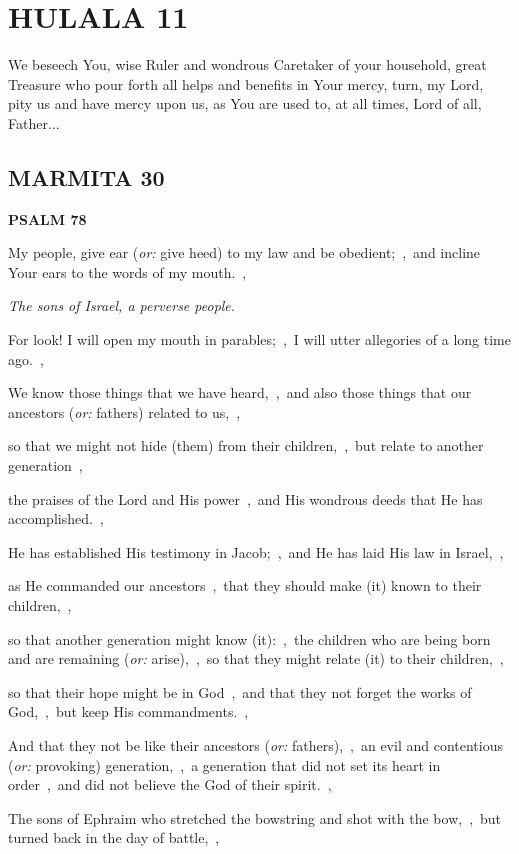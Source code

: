 \documentclass[12pt,twoside,a5paper]{article}
\newcommand{\hulala}[1]{\section*{HULALA {#1}}}
\newcommand{\marmita}[1]{\subsection*{MARMITA {#1}}}
\newcommand{\psalm}[1]{\textbf{PSALM {#1}}\nopagebreak}
\newcommand{\qanona}[1]{{\liturgicalhint{Qanona.} \emph{#1}}}
\newcommand{\slota}[1]{\liturgicalhint{Slota.} #1}
\newcommand{\translationoption}[1]{\emph{or:} #1}
\begin{document}

\hulala{11}

\slota{We beseech You, wise Ruler and wondrous Caretaker of your household, great Treasure who pour forth all helps and benefits in Your mercy, turn, my Lord, pity us and have mercy upon us, as You are used to, at all times, Lord of all, Father...}

\marmita{30}

\psalm{78}

\begin{normalparskip}
  My people, give ear (\translationoption{give heed}) to my law and be obedient;~\sep\ and incline Your ears to the words of my mouth.~\sep

  \qanona{The sons of Israel, a perverse people.}

  For look! I will open my mouth in parables;~\sep\ I will utter allegories of a long time ago.~\sep

  We know those things that we have heard,~\sep\ and also those things that our ancestors (\translationoption{fathers}) related to us,~\sep

  so that we might not hide (them) from their children,~\sep\ but relate to another generation~\sep

  the praises of the Lord and His power~\sep\ and His wondrous deeds that He has accomplished.~\sep

  He has established His testimony in Jacob;~\sep\ and He has laid His law in Israel,~\sep

  as He commanded our ancestors~\sep\ that they should make (it) known to their children,~\sep

  so that another generation might know (it):~\sep\ the children who are being born and are remaining (\translationoption{arise}),~\sep\ so that they might relate (it) to their children,~\sep

  so that their hope might be in God~\sep\ and that they not forget the works of God,~\sep\ but keep His commandments.~\sep

  And that they not be like their ancestors (\translationoption{fathers}),~\sep\ an evil and contentious (\translationoption{provoking}) generation,~\sep\ a generation that did not set its heart in order~\sep\ and did not believe the God of their spirit.~\sep

  The sons of Ephraim who stretched the bowstring and shot with the bow,~\sep\ but turned back in the day of battle,~\sep


\end{normalparskip}
\end{document}
